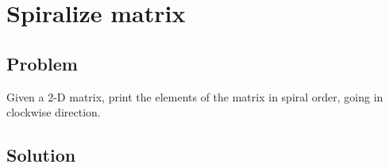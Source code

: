 
\section{Spiralize matrix}



\subsection*{Problem}

Given a 2-D matrix, print the elements of the matrix in spiral order,
going in clockwise direction.



\subsection*{Solution}

